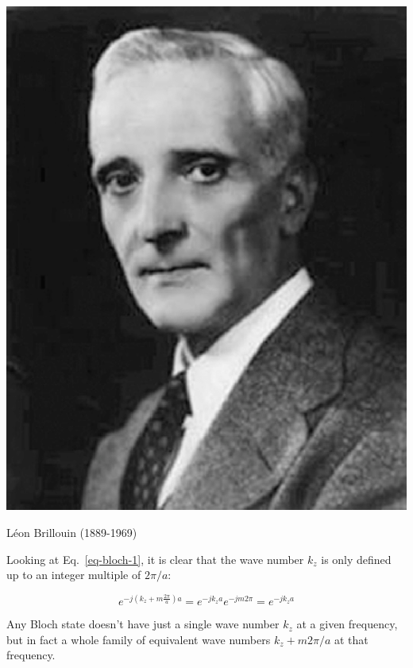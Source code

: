 \pagebreak


\begin{marginfigure}[-0.0cm]
\includegraphics{symmetry/figures/l_brillouin}
\caption{L\'{e}on Brillouin (1889-1969)}
\end{marginfigure}

Looking at Eq.~\ref{eq-bloch-1}, it is clear that the wave number $k_z$ is only defined up to an integer multiple of $2 \pi/a$:

\begin{equation}
e^{-j (k_z + m\frac{2 \pi}{a} ) a} = e^{-j k_z a} e^{-j m 2 \pi} = e^{-j k_z a}
\end{equation} 

Any Bloch state doesn't have just a single wave number $k_z$ at a given frequency, but in fact a whole family of equivalent wave numbers $k_z+m 2 \pi /a$ at that frequency.

